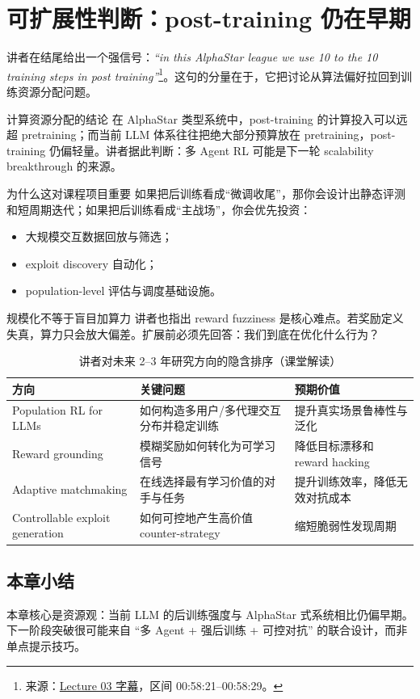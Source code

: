 \section{可扩展性判断：post-training 仍在早期}

讲者在结尾给出一个强信号：\textit{``in this AlphaStar league we use 10 to the 10 training steps in post training''}\footnote{来源：\href{https://www.youtube.com/watch?v=ntjOxjZMaac}{Lecture 03 字幕}，区间 00:58:21--00:58:29。}。这句的分量在于，它把讨论从算法偏好拉回到训练资源分配问题。

\begin{importantbox}{计算资源分配的结论}
在 AlphaStar 类型系统中，post-training 的计算投入可以远超 pretraining；而当前 LLM 体系往往把绝大部分预算放在 pretraining，post-training 仍偏轻量。讲者据此判断：多 Agent RL 可能是下一轮 scalability breakthrough 的来源。
\end{importantbox}

\begin{knowledgebox}{为什么这对课程项目重要}
如果把后训练看成``微调收尾''，那你会设计出静态评测和短周期迭代；如果把后训练看成``主战场''，你会优先投资：
\begin{itemize}
    \item 大规模交互数据回放与筛选；
    \item exploit discovery 自动化；
    \item population-level 评估与调度基础设施。
\end{itemize}
\end{knowledgebox}

\begin{warningbox}{规模化不等于盲目加算力}
讲者也指出 reward fuzziness 是核心难点。若奖励定义失真，算力只会放大偏差。扩展前必须先回答：我们到底在优化什么行为？
\end{warningbox}

\begin{table}[H]
\centering
\caption{讲者对未来 2--3 年研究方向的隐含排序（课堂解读）}
\begin{tabular}{p{3.0cm}p{4.8cm}p{4.8cm}}
\toprule
方向 & 关键问题 & 预期价值 \\
\midrule
Population RL for LLMs & 如何构造多用户/多代理交互分布并稳定训练 & 提升真实场景鲁棒性与泛化 \\
Reward grounding & 模糊奖励如何转化为可学习信号 & 降低目标漂移和 reward hacking \\
Adaptive matchmaking & 在线选择最有学习价值的对手与任务 & 提升训练效率，降低无效对抗成本 \\
Controllable exploit generation & 如何可控地产生高价值 counter-strategy & 缩短脆弱性发现周期 \\
\bottomrule
\end{tabular}
\end{table}

\subsection{本章小结}
本章核心是资源观：当前 LLM 的后训练强度与 AlphaStar 式系统相比仍偏早期。下一阶段突破很可能来自 ``多 Agent + 强后训练 + 可控对抗'' 的联合设计，而非单点提示技巧。

